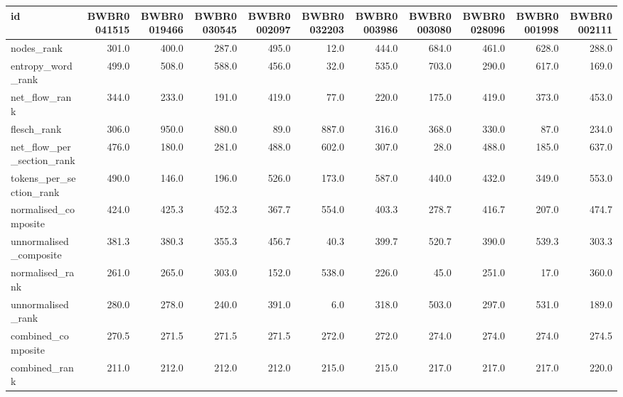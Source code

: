 \begin{tabular}{lrrrrrrrrrr}
\toprule
id & BWBR0041515 & BWBR0019466 & BWBR0030545 & BWBR0002097 & BWBR0032203 & BWBR0003986 & BWBR0003080 & BWBR0028096 & BWBR0001998 & BWBR0002111 \\
\midrule
nodes\_rank & 301.0 & 400.0 & 287.0 & 495.0 & 12.0 & 444.0 & 684.0 & 461.0 & 628.0 & 288.0 \\
\cline{1-11}
entropy\_word\_rank & 499.0 & 508.0 & 588.0 & 456.0 & 32.0 & 535.0 & 703.0 & 290.0 & 617.0 & 169.0 \\
\cline{1-11}
net\_flow\_rank & 344.0 & 233.0 & 191.0 & 419.0 & 77.0 & 220.0 & 175.0 & 419.0 & 373.0 & 453.0 \\
\cline{1-11}
flesch\_rank & 306.0 & 950.0 & 880.0 & 89.0 & 887.0 & 316.0 & 368.0 & 330.0 & 87.0 & 234.0 \\
\cline{1-11}
net\_flow\_per\_section\_rank & 476.0 & 180.0 & 281.0 & 488.0 & 602.0 & 307.0 & 28.0 & 488.0 & 185.0 & 637.0 \\
\cline{1-11}
tokens\_per\_section\_rank & 490.0 & 146.0 & 196.0 & 526.0 & 173.0 & 587.0 & 440.0 & 432.0 & 349.0 & 553.0 \\
\cline{1-11}
normalised\_composite & 424.0 & 425.3 & 452.3 & 367.7 & 554.0 & 403.3 & 278.7 & 416.7 & 207.0 & 474.7 \\
\cline{1-11}
unnormalised\_composite & 381.3 & 380.3 & 355.3 & 456.7 & 40.3 & 399.7 & 520.7 & 390.0 & 539.3 & 303.3 \\
\cline{1-11}
normalised\_rank & 261.0 & 265.0 & 303.0 & 152.0 & 538.0 & 226.0 & 45.0 & 251.0 & 17.0 & 360.0 \\
\cline{1-11}
unnormalised\_rank & 280.0 & 278.0 & 240.0 & 391.0 & 6.0 & 318.0 & 503.0 & 297.0 & 531.0 & 189.0 \\
\cline{1-11}
combined\_composite & 270.5 & 271.5 & 271.5 & 271.5 & 272.0 & 272.0 & 274.0 & 274.0 & 274.0 & 274.5 \\
\cline{1-11}
combined\_rank & 211.0 & 212.0 & 212.0 & 212.0 & 215.0 & 215.0 & 217.0 & 217.0 & 217.0 & 220.0 \\
\cline{1-11}
\bottomrule
\end{tabular}
